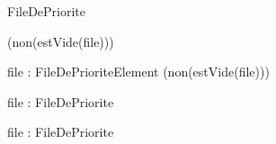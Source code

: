 \begin{algorithme}
    {}{FileDePriorite}{}

    {
    }{}

    {}
    {(non(estVide(file)))}

    {file : FileDePriorite}{Element}
    {(non(estVide(file)))}

    {file : FileDePriorite}{\booleen}{}

    {file : FileDePriorite}{\naturelNonNul}{}

\end{algorithme}
